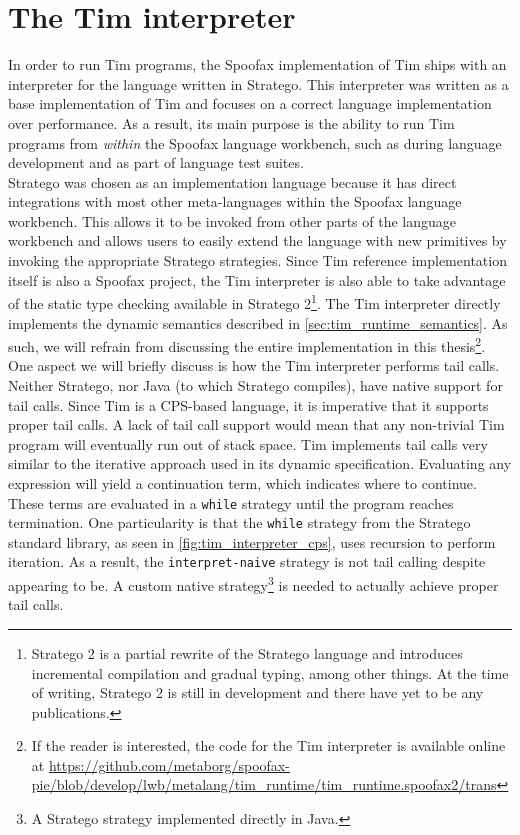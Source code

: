 \section{The Tim interpreter}
\label{sec:tim_interpreter}
In order to run Tim programs, the Spoofax implementation of Tim ships with an interpreter for the language written in Stratego. This interpreter was written as a base implementation of Tim and focuses on a correct language implementation over performance. As a result, its main purpose is the ability to run Tim programs from \textit{within} the Spoofax language workbench, such as during language development and as part of language test suites.\\

Stratego was chosen as an implementation language because it has direct integrations with most other meta-languages within the Spoofax language workbench. This allows it to be invoked from other parts of the language workbench and allows users to easily extend the language with new primitives by invoking the appropriate Stratego strategies. Since Tim reference implementation itself is also a Spoofax project, the Tim interpreter is also able to take advantage of the static type checking available in Stratego 2\footnote{Stratego 2 is a partial rewrite of the Stratego language and introduces incremental compilation and gradual typing, among other things. At the time of writing, Stratego 2 is still in development and there have yet to be any publications.}. The Tim interpreter directly implements the dynamic semantics described in \cref{sec:tim_runtime_semantics}. As such, we will refrain from discussing the entire implementation in this thesis\footnote{If the reader is interested, the code for the Tim interpreter is available online at \url{https://github.com/metaborg/spoofax-pie/blob/develop/lwb/metalang/tim_runtime/tim_runtime.spoofax2/trans}}.\\

One aspect we will briefly discuss is how the Tim interpreter performs tail calls. Neither Stratego, nor Java (to which Stratego compiles), have native support for tail calls. Since Tim is a \ac{CPS}-based language, it is imperative that it supports proper tail calls. A lack of tail call support would mean that any non-trivial Tim program will eventually run out of stack space. Tim implements tail calls very similar to the iterative approach used in its dynamic specification. Evaluating any expression will yield a continuation term, which indicates where to continue. These terms are evaluated in a \texttt{while} strategy until the program reaches termination. One particularity is that the \texttt{while} strategy from the Stratego standard library, as seen in \cref{fig:tim_interpreter_cps}, uses recursion to perform iteration. As a result, the \texttt{interpret-naive} strategy is not tail calling despite appearing to be. A custom native strategy\footnote{A Stratego strategy implemented directly in Java.} is needed to actually achieve proper tail calls.

